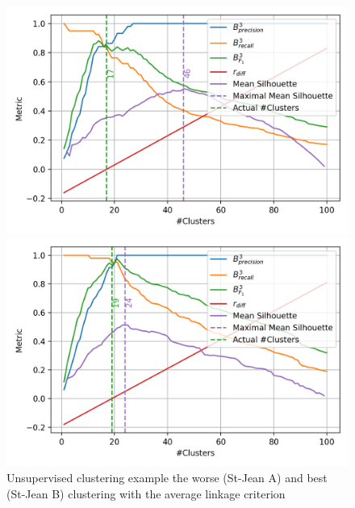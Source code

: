 \begin{figure}
  \caption{Unsupervised clustering example the worse (St-Jean A) and best (St-Jean B) clustering with the average linkage criterion}
  \label{fig:unsupervised_clustering}

  \label{fig:unsupervised_clustering_st_jean_A_average}
  \includegraphics[width=\linewidth]{img/unsupervised_clustering_st_jean_A_average.png}

  \vspace{0.5cm}

  \label{fig:unsupervised_clustering_st_jean_B_average}
  \includegraphics[width=\linewidth]{img/unsupervised_clustering_st_jean_B_average.png}
\end{figure}
